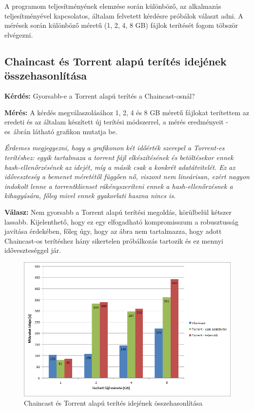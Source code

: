 A programom teljesítményének elemzése során különböző, az alkalmazás teljesítményével kapcsolatos, általam felvetett kérdésre próbálok választ adni. A mérések során különböző méretű (1, 2, 4, 8 GB) fájlok terítését fogom töbször elvégezni.

%
\subsection{Chaincast és Torrent alapú terítés idejének összehasonlítása}
%
\textbf{Kérdés:} Gyorsabb-e a Torrent alapú terítés a Chaincast-osnál?

\textbf{Mérés:} A kérdés megválaszolásához 1, 2, 4 és 8 GB méretű fájlokat terítettem az eredeti és az általam készített új terítési módszerrel, a mérés eredményeit  -es~ábrán látható grafikon mutatja be.


\textit{Érdemes megjegyezni, hogy a grafikonon két időérték szerepel a Torrent-es terítéshez: egyik tartalmaza a torrent fájl elkészítésének és betöltésekor ennek hash-ellenőrzésének az idejét, míg a másik csak a konkrét adatátvitelét. Ez az időveszteség a bemenet méretétől függően nő, viszont nem lineárisan, ezért nagyon indokolt lenne a torrentklienset rákényszeríteni ennek a hash-ellenőrzésnek a kihagyására, főleg mivel ennek gyakorlati haszna nincs is.}

\textbf{Válasz:} Nem gyorsabb a Torrent alapú terítési megoldás, körülbelül kétszer lassabb. Kijelenthető, hogy ez egy elfogadható kompromisszum a robusztusság javítása érdekében, főleg úgy, hogy az ábra nem tartalmazza, hogy adott Chaincast-os terítéshez hány sikertelen próbálkozás tartozik és ez mennyi időveszteséggel jár. 

\begin{figure}[ht]
\centering
\includegraphics[width=150mm, keepaspectratio]{figures/Perf_chaincast_torrent_comparison.png}
\caption{Chaincast és Torrent alapú terítés idejének összehasonlítása}
\label{fig:chaincasttorrrentcomparison}
\end{figure}

